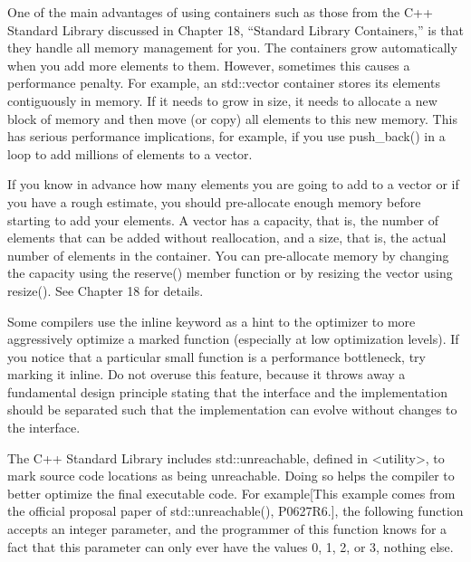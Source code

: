 
One of the main advantages of using containers such as those from the C++ Standard Library discussed in Chapter 18, “Standard Library Containers,” is that they handle all memory management for you. The containers grow automatically when you add more elements to them. However, sometimes this causes a performance penalty. For example, an std::vector container stores its elements contiguously in memory. If it needs to grow in size, it needs to allocate a new block of memory and then move (or copy) all elements to this new memory. This has serious performance implications, for example, if you use push\_back() in a loop to add millions of elements to a vector.

If you know in advance how many elements you are going to add to a vector or if you have a rough estimate, you should pre-allocate enough memory before starting to add your elements. A vector has a capacity, that is, the number of elements that can be added without reallocation, and a size, that is, the actual number of elements in the container. You can pre-allocate memory by changing the capacity using the reserve() member function or by resizing the vector using resize(). See Chapter 18 for details.


Some compilers use the inline keyword as a hint to the optimizer to more aggressively optimize a marked function (especially at low optimization levels). If you notice that a particular small function is a performance bottleneck, try marking it inline. Do not overuse this feature, because it throws away a fundamental design principle stating that the interface and the implementation should be separated such that the implementation can evolve without changes to the interface.



The C++ Standard Library includes std::unreachable, defined in <utility>, to mark source code locations as being unreachable. Doing so helps the compiler to better optimize the final executable code. For example[This example comes from the official proposal paper of std::unreachable(), P0627R6.], the following function accepts an integer parameter, and the programmer of this function knows for a fact that this parameter can only ever have the values 0, 1, 2, or 3, nothing else.

